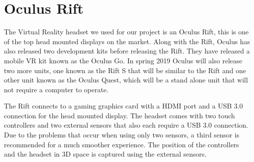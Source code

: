 
\section {Oculus Rift}
The Virtual Reality headset we used for our project is an Oculus Rift, this is one of the top head mounted displays on the market. Along with the Rift, Oculus has also released two development kits before releasing the Rift. They have released a mobile VR kit known as the Oculus Go. In spring 2019 Oculus will also release two more units, one known as the Rift S that will be similar to the Rift and one other unit known as the Oculus Quest, which will be a stand alone unit that will not require a computer to operate. \newline

The Rift connects to a gaming graphics card with a HDMI port and a USB 3.0 connection for the head mounted display. The headset comes with two touch controllers and two external sensors that also each require a USB 3.0 connection. Due to the problems that occur when using only two sensors, a third sensor is recommended for a much smoother experience. The position of the controllers and the headset in 3D space is captured using the external sensors.